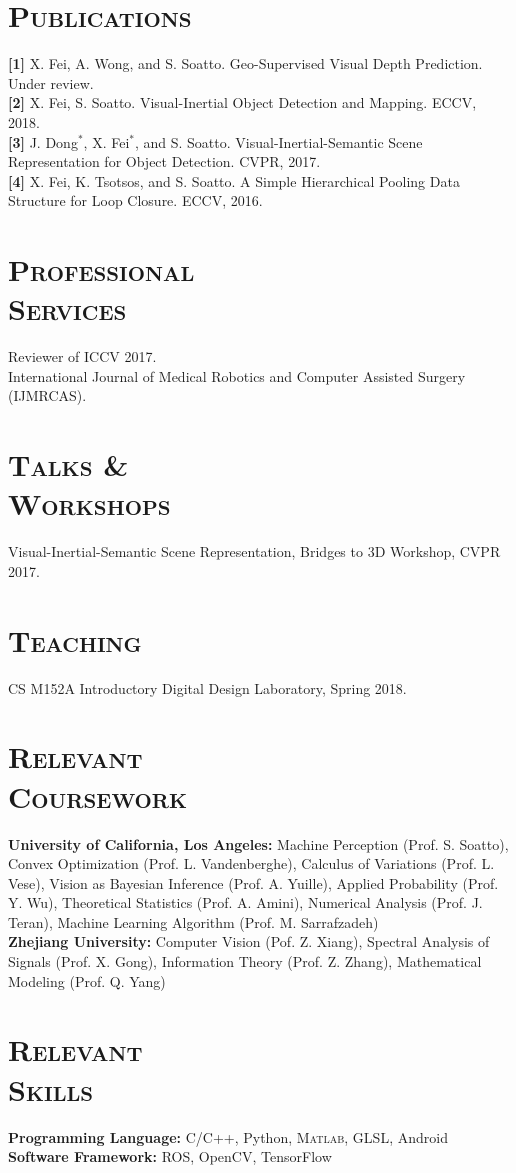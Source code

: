 \documentclass[margin, line, 10pt]{res} %
\begin{document}
\begin{resume}
\section{\textsc{Publications}}

\textbf{[1]} X. Fei, A. Wong, and S. Soatto. Geo-Supervised Visual Depth Prediction. Under review.\\
\textbf{[2]} X. Fei, S. Soatto. Visual-Inertial Object Detection and Mapping. ECCV, 2018.\\
\textbf{[3]} J. Dong$^*$, X. Fei$^*$, and S. Soatto. Visual-Inertial-Semantic Scene Representation for Object Detection. CVPR, 2017.\\
\textbf{[4]} X. Fei, K. Tsotsos, and S. Soatto. A Simple Hierarchical Pooling Data Structure for Loop Closure. ECCV, 2016.

\section{\textsc{Professional\\Services}}
Reviewer of ICCV 2017.\\
International Journal of Medical Robotics and Computer Assisted Surgery (IJMRCAS).

\section{\textsc{Talks \&\\Workshops}}
Visual-Inertial-Semantic Scene Representation, Bridges to 3D Workshop, CVPR 2017.

\section{\textsc{Teaching}}
CS M152A Introductory Digital Design Laboratory, Spring 2018.

\section{\textsc{Relevant\\Coursework}}
\textbf{University of California, Los Angeles:} Machine Perception (Prof. S. Soatto), Convex Optimization (Prof. L. Vandenberghe), Calculus of Variations (Prof. L. Vese), Vision as Bayesian Inference (Prof. A. Yuille), Applied Probability (Prof. Y. Wu), Theoretical Statistics (Prof. A. Amini), Numerical Analysis (Prof. J. Teran), Machine Learning Algorithm (Prof. M. Sarrafzadeh)\\
\textbf{Zhejiang University:} Computer Vision (Pof. Z. Xiang), Spectral Analysis of Signals (Prof. X. Gong), Information Theory (Prof. Z. Zhang), Mathematical Modeling (Prof. Q. Yang)

\section{\textsc{Relevant\\Skills}}
\textbf{Programming Language:} C/C++, Python, \textsc{Matlab}, GLSL, Android\\
\textbf{Software Framework:} ROS, OpenCV, TensorFlow


\end{resume}
\end{document}
